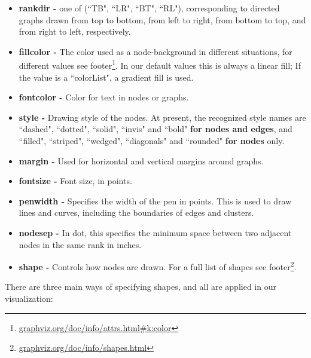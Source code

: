 \documentclass[a4paper, 12pt, bibliography=totoc]{scrartcl}
\begin{document}
\begin{itemize}
	\item \textbf{rankdir -} one of (``TB", ``LR", ``BT", ``RL"), corresponding to directed graphs drawn from top to bottom, from left to right, from bottom to top, and from right to left, respectively.
	
	\item \textbf{fillcolor -} The color used as a node-background in different situations, for different values see footer\footnote{\url{graphviz.org/doc/info/attrs.html\#k:color}}.  
	In our default values this is always a linear fill; If the value is a ``colorList", a gradient fill is used. 
	
	\item \textbf{fontcolor -} Color for text in nodes or graphs. 
	
	\item \textbf{style -} Drawing style of the nodes.
	At present, the recognized style names are ``dashed", ``dotted", ``solid", ``invis" and ``bold" \textbf{for nodes and edges},  and ``filled", ``striped", ``wedged", ``diagonals" and ``rounded" \textbf{for nodes} only.
	
	\item 
	\textbf{margin -} Used for horizontal and vertical margins around graphs.
	
	\item \textbf{fontsize -} Font size, in points. 
	
	\item \textbf{penwidth -} Specifies the width of the pen in points. This is used to draw lines and curves, including the boundaries of edges and clusters. 
	
	\item \textbf{nodesep -} In dot, this specifies the minimum space between two adjacent nodes in the same rank in inches. 
	
	\item \textbf{shape -} Controls how nodes are drawn. For a full list of shapes see footer\footnote{\url{graphviz.org/doc/info/shapes.html}}. 
\end{itemize} 
\pagebreak
There are three main ways of specifying shapes, and all are applied in our visualization: 
\end{document}
